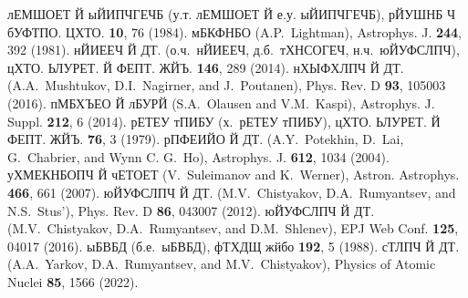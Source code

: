 \documentclass[koi8-r]{pazh2col}
\begin{document}

\begin{references}
%
лЕМШОЕТ Й ыЙИПЧГЕЧБ (у.т. лЕМШОЕТ Й е.у. ыЙИПЧГЕЧБ), рЙУШНБ Ч бУФТПО. ЦХТО. \textbf{10}, 76  (1984).
%
мБКФНБО (A.P.~Lightman), Astrophys. J. \textbf{244}, 392 (1981).
%
нЙИЕЕЧ Й ДТ. (о.ч.~нЙИЕЕЧ, д.б.~тХНСОГЕЧ, н.ч.~юЙУФСЛПЧ), цХТО. ЬЛУРЕТ. Й ФЕПТ. ЖЙЪ. \textbf{146}, 289  (2014).
%
нХЫФХЛПЧ Й ДТ. (A.A.~Mushtukov, D.I.~Nagirner, and J.~Poutanen), Phys. Rev. D  \textbf{93}, 105003 (2016).
%
пМБХЪЕО Й лБУРЙ (S.A.~Olausen and  V.M.~Kaspi), Astrophys. J. Suppl. \textbf{212}, 6 (2014).
%
рЕТЕУ тПИБУ (х.~рЕТЕУ тПИБУ), цХТО. ЬЛУРЕТ. Й ФЕПТ. ЖЙЪ. \textbf{76}, 3  (1979).
%
рПФЕИЙО Й ДТ. (A.Y.~Potekhin, D.~Lai, G.~Chabrier, and Wynn C. G.~Ho), Astrophys. J. \textbf{612}, 1034 (2004).
%
уХМЕКНБОПЧ Й чЕТОЕТ (V.~Suleimanov and K.~Werner), Astron. Astrophys. \textbf{466}, 661 (2007).
%
юЙУФСЛПЧ Й ДТ. (M.V.~Chistyakov, D.A.~Rumyantsev, and N.S.~Stus'), Phys. Rev. D  \textbf{86}, 043007 (2012).
%
юЙУФСЛПЧ Й ДТ. (M.V.~Chistyakov, D.A.~Rumyantsev, and D.M.~Shlenev), EPJ Web Conf. \textbf{125}, 04017 (2016).
%
ыБВБД (б.е.~ыБВБД), фТХДЩ жйбо \textbf{192}, 5 (1988).  
%
сТЛПЧ Й ДТ. (A.A.~Yarkov, D.A.~Rumyantsev, and  M.V.~Chistyakov), Physics of Atomic Nuclei \textbf{85}, 1566 (2022).
%
%
%
%

\end{references}
\end{document}
